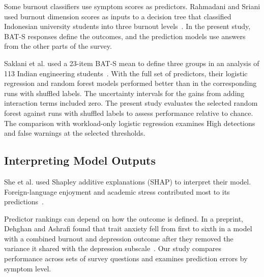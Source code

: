 Some burnout classifiers use symptom scores as predictors. Rahmadani and Sriani used burnout dimension scores as inputs to a decision tree that classified Indonesian university students into three burnout levels~\cite{rahmadani2026burnout}. In the present study, BAT-S responses define the outcomes, and the prediction models use answers from the other parts of the survey.

Saklani et al. used a 23-item BAT-S mean to define three groups in an analysis of 113 Indian engineering students~\cite{saklani2026burnout}. With the full set of predictors, their logistic regression and random forest models performed better than in the corresponding runs with shuffled labels. The uncertainty intervals for the gains from adding interaction terms included zero. The present study evaluates the selected random forest against runs with shuffled labels to assess performance relative to chance. The comparison with workload-only logistic regression examines High detections and false warnings at the selected thresholds.

\subsection{Interpreting Model Outputs}

She et al. used Shapley additive explanations (SHAP) to interpret their model. Foreign-language enjoyment and academic stress contributed most to its predictions~\cite{she2026languageburnout}.

Predictor rankings can depend on how the outcome is defined. In a preprint, Dehghan and Ashrafi found that trait anxiety fell from first to sixth in a model with a combined burnout and depression outcome after they removed the variance it shared with the depression subscale~\cite{dehghan2026overlap}. Our study compares performance across sets of survey questions and examines prediction errors by symptom level.
